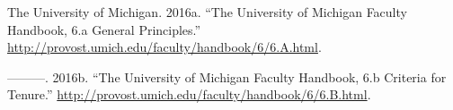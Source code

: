 \documentclass[
  11pt,
  letterpaper,
  DIV=11,
  numbers=noendperiod]{scrartcl}
\newlength{\cslhangindent}
\newenvironment{CSLReferences}[2] %
 {\begin{list}{}{%
  \setlength{\itemindent}{0pt}
  \setlength{\leftmargin}{0pt}
  \setlength{\parsep}{0pt}
  \ifodd #1
   \setlength{\leftmargin}{\cslhangindent}
   \setlength{\itemindent}{-1\cslhangindent}
  \fi
  \setlength{\itemsep}{#2\baselineskip}}}
 {\end{list}}
\begin{document}
\begin{CSLReferences}{1}{0}
The University of Michigan. 2016a. {``The University of Michigan Faculty
Handbook, 6.a General Principles.''}
\url{http://provost.umich.edu/faculty/handbook/6/6.A.html}.

---------. 2016b. {``The University of Michigan Faculty Handbook, 6.b
Criteria for Tenure.''}
\url{http://provost.umich.edu/faculty/handbook/6/6.B.html}.

\end{CSLReferences}
\end{document}
